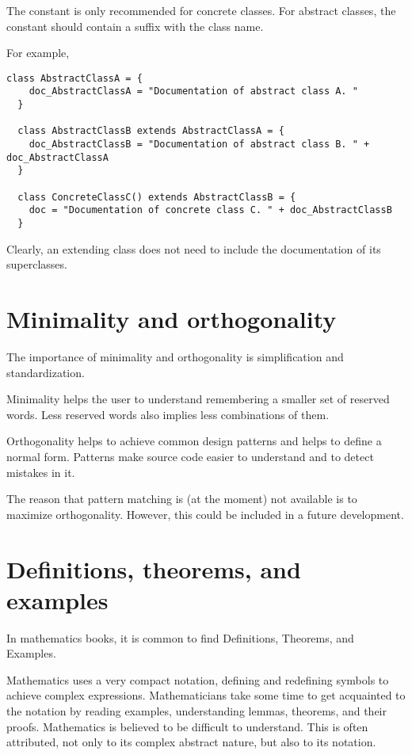 The  constant is only recommended for concrete classes.
For abstract classes, the constant should contain a suffix with the class name.

For example,
\begin{lstlisting}[label={lst:exampleAbstractAndConcreteClassesWithComment}]
  class AbstractClassA = {
    doc_AbstractClassA = "Documentation of abstract class A. "
  }

  class AbstractClassB extends AbstractClassA = {
    doc_AbstractClassB = "Documentation of abstract class B. " + doc_AbstractClassA
  }

  class ConcreteClassC() extends AbstractClassB = {
    doc = "Documentation of concrete class C. " + doc_AbstractClassB
  }
\end{lstlisting}

Clearly, an extending class does not need to include the documentation of its superclasses.


\section{Minimality and orthogonality}

The importance of minimality and orthogonality is simplification and standardization.

Minimality helps the user to understand remembering a smaller set of reserved words.
Less reserved words also implies less combinations of them.

Orthogonality helps to achieve common design patterns and helps to define a normal form.
Patterns make source code easier to understand and to detect mistakes in it.

The reason that pattern matching is (at the moment) not available is to maximize orthogonality.
However, this could be included in a future development.


\section{Definitions, theorems, and examples}

In mathematics books, it is common to find Definitions, Theorems, and Examples.

Mathematics uses a very compact notation, defining and redefining symbols to achieve complex expressions.
Mathematicians take some time to get acquainted to the notation by reading examples, understanding lemmas, theorems, and their proofs.
Mathematics is believed to be difficult to understand.
This is often attributed, not only to its complex abstract nature, but also to its notation.

